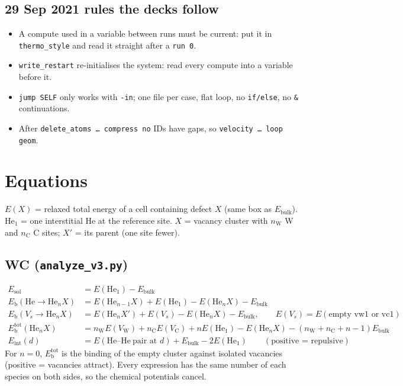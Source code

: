 \documentclass[10pt]{article}
\newcommand{\cmd}[1]{\texttt{\small #1}}
\newcommand{\Eb}{E_\mathrm{b}}
\newcommand{\Eblk}{E_\mathrm{bulk}}
\newcommand{\He}{\mathrm{He}}
\newcommand{\sect}[1]{\Needspace{12\baselineskip}\section{#1}}
\begin{document}
\subsection*{29 Sep 2021 rules the decks follow}
\begin{itemize}
\item A compute used in a variable between runs must be current: put it in \cmd{thermo\_style} and read it straight after a \cmd{run 0}.
\item \cmd{write\_restart} re-initialises the system: read every compute into a variable before it.
\item \cmd{jump SELF} only works with \cmd{-in}; one file per case, flat loop, no \cmd{if/else}, no \cmd{\&} continuations.
\item After \cmd{delete\_atoms … compress no} IDs have gaps, so \cmd{velocity … loop geom}.
\end{itemize}

\sect{Equations}
$E(X)$ = relaxed total energy of a cell containing defect $X$ (same box as $\Eblk$).
$\He_1$ = one interstitial He at the reference site. $X$ = vacancy cluster with $n_\mathrm{W}$ W and $n_\mathrm{C}$ C sites; $X'$ = its parent (one site fewer).

\subsection{WC (\texttt{analyze\_v3.py})}
\begin{align}
E_\mathrm{sol} &= E(\He_1) - \Eblk \\
\Eb(\He\to\He_nX) &= E(\He_{n-1}X) + E(\He_1) - E(\He_nX) - \Eblk \\
\Eb(V_s\to\He_nX) &= E(\He_nX') + E(V_s) - E(\He_nX) - \Eblk, \qquad E(V_s)=E(\text{empty vw1 or vc1}) \\
\Eb^\mathrm{tot}(\He_nX) &= n_\mathrm{W}E(V_\mathrm{W}) + n_\mathrm{C}E(V_\mathrm{C}) + nE(\He_1) - E(\He_nX) - (n_\mathrm{W}+n_\mathrm{C}+n-1)\Eblk \\
E_\mathrm{int}(d) &= E(\He\text{--}\He\ \text{pair at } d) + \Eblk - 2E(\He_1) \qquad (\text{positive = repulsive})
\end{align}
For $n=0$, $\Eb^\mathrm{tot}$ is the binding of the empty cluster against isolated vacancies (positive = vacancies attract).
Every expression has the same number of each species on both sides, so the chemical potentials cancel.
\end{document}
